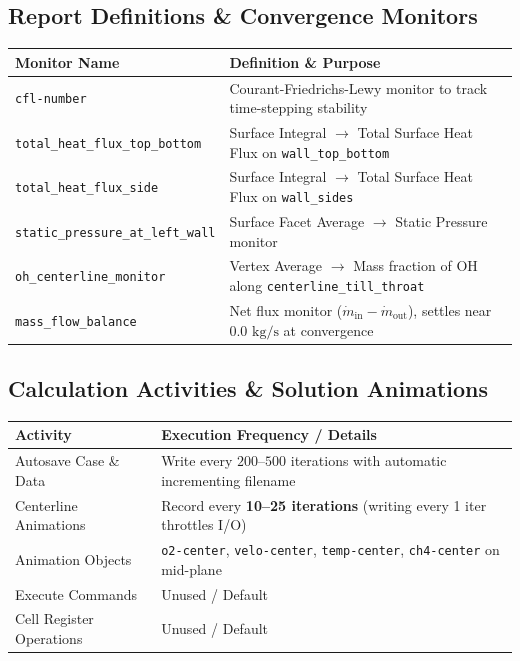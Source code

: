 \documentclass[11pt,a4paper]{article}
\begin{document}
\subsection{Report Definitions \& Convergence Monitors}
\begin{tabularx}{\textwidth}{L{5.8cm} Y}
\toprule
\textbf{Monitor Name} & \textbf{Definition \& Purpose} \\
\midrule
\texttt{cfl-number} & Courant-Friedrichs-Lewy monitor to track time-stepping stability \\
\texttt{total\_heat\_flux\_top\_bottom} & Surface Integral $\to$ Total Surface Heat Flux on \texttt{wall\_top\_bottom} \\
\texttt{total\_heat\_flux\_side} & Surface Integral $\to$ Total Surface Heat Flux on \texttt{wall\_sides} \\
\texttt{static\_pressure\_at\_left\_wall} & Surface Facet Average $\to$ Static Pressure monitor \\
\texttt{oh\_centerline\_monitor} & Vertex Average $\to$ Mass fraction of OH along \texttt{centerline\_till\_throat} \\
\texttt{mass\_flow\_balance} & Net flux monitor ($\dot{m}_\text{in} - \dot{m}_\text{out}$), settles near $0.0\text{ kg/s}$ at convergence \\
\bottomrule
\end{tabularx}

\subsection{Calculation Activities \& Solution Animations}
\begin{tabularx}{\textwidth}{L{4.5cm} Y}
\toprule
\textbf{Activity} & \textbf{Execution Frequency / Details} \\
\midrule
Autosave Case \& Data & Write every $200$--$500$ iterations with automatic incrementing filename \\
Centerline Animations & Record every \textbf{10--25 iterations} (writing every 1 iter throttles I/O) \\
Animation Objects & \texttt{o2-center}, \texttt{velo-center}, \texttt{temp-center}, \texttt{ch4-center} on mid-plane \\
Execute Commands & Unused / Default \\
Cell Register Operations & Unused / Default \\
\bottomrule
\end{tabularx}

\end{document}
